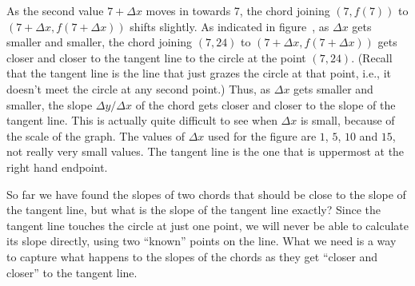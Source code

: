 As the second value $7+\Delta x$ moves in towards 7, the chord joining
$(7,f(7))$ to $(7+\Delta x,f(7+\Delta x))$ shifts slightly.  As
indicated in figure~, as $\Delta x$ gets smaller and
smaller, the chord joining $(7,24)$ to $(7+\Delta x,f(7+\Delta x))$
gets closer and closer to the {\dfont tangent line} to the circle at the point $(7,24)$.  (Recall that the
tangent line is the line that just grazes the circle at that point,
i.e., it doesn't meet the circle at any second point.)  Thus, as
$\Delta x$ gets smaller and smaller, the slope $\Delta y/\Delta x$ of
the chord gets closer and closer to the slope of the tangent line.
This is actually quite difficult to see when $\Delta x$ is small,
because of the scale of the graph. The values of $\Delta x$ used for
the figure are $1$, $5$, $10$ and $15$, not really very small values.
The tangent line is the one that is uppermost at the right hand
endpoint.


So far we have found the slopes of two chords that should be close to
the slope of the tangent line, but what is the slope of the tangent
line exactly? Since the tangent line touches the circle at just one
point, we will never be able to calculate its slope directly, using
two ``known'' points on the line. What we need is a way to capture
what happens to the slopes of the chords as they get ``closer and
closer'' to the tangent line.

